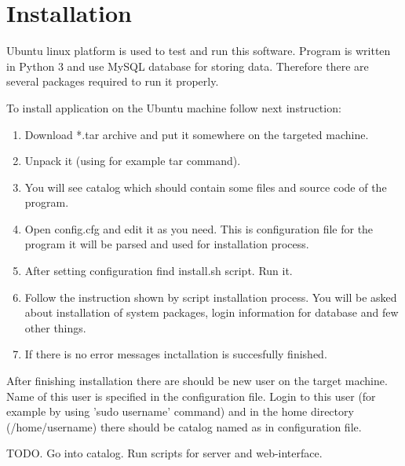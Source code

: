 \documentclass[12pt]{article}
\begin{document}
\section{Installation}
\par Ubuntu linux platform is used to test and run this software. Program is
written in Python 3 and use MySQL database for storing data. Therefore there
are several packages required to run it properly.
\par To install application on the Ubuntu machine follow next instruction:
\begin{enumerate}
    \item Download *.tar archive and put it somewhere on the targeted machine.
    \item Unpack it (using for example tar command).
    \item You will see catalog which should contain some files and source code
    of the program. 
    \item Open config.cfg and edit it as you need. This is configuration file
    for the program it will be parsed and used for installation process.
    \item After setting configuration find install.sh script. Run it.
    \item Follow the instruction shown by script installation process. You will
    be asked about installation of system packages, login information 
    for database and few other things.
    \item If there is no error messages inctallation is succesfully finished.
\end{enumerate}

\par After finishing installation there are should be new user on the target
machine. Name of this user is specified in the configuration file. Login to
this user (for example by using 'sudo username' command) and in the home
directory (/home/username) there should be catalog named as in configuration
file. 
\par TODO. Go into catalog. Run scripts for server and web-interface.
\end{document}
